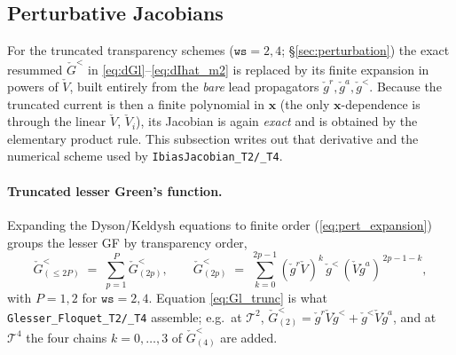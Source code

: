 \documentclass[11pt,a4paper]{article}
\begin{document}
\subsection{Perturbative Jacobians}
\label{sec:pert_jacobian}

For the truncated transparency schemes ($\texttt{ws}=2,4$;
\S\ref{sec:perturbation}) the exact resummed $\check G^<$ in
\eqref{eq:dGl}--\eqref{eq:dIhat_m2} is replaced by its finite expansion in powers
of $\check V$, built entirely from the \emph{bare} lead propagators
$\check g^r,\check g^a,\check g^<$.  Because the truncated current is then a finite
polynomial in $\mathbf x$ (the only $\mathbf x$-dependence is through the linear
$\check V$, $\check V_i$), its Jacobian is again \emph{exact} and is obtained by
the elementary product rule.  This subsection writes out that derivative and the
numerical scheme used by \texttt{IbiasJacobian\_T2/\_T4}.

\paragraph{Truncated lesser Green's function.}
Expanding the Dyson/Keldysh equations to finite order (\eqref{eq:pert_expansion})
groups the lesser GF by transparency order,
\begin{equation}
  \check G^<_{(\le 2P)} \;=\; \sum_{p=1}^{P}\check G^<_{(2p)},
  \qquad
  \check G^<_{(2p)} \;=\; \sum_{k=0}^{2p-1}
  (\check g^r\check V)^{k}\,\check g^<\,(\check V\check g^a)^{\,2p-1-k},
  \label{eq:Gl_trunc}
\end{equation}
with $P=1,2$ for $\texttt{ws}=2,4$.  Equation \eqref{eq:Gl_trunc} is what
\texttt{Glesser\_Floquet\_T2/\_T4} assemble; e.g.\ at $\mathcal T^2$,
$\check G^<_{(2)}=\check g^r\check V\check g^<+\check g^<\check V\check g^a$, and at
$\mathcal T^4$ the four chains $k=0,\dots,3$ of $\check G^<_{(4)}$ are added.
\end{document}
